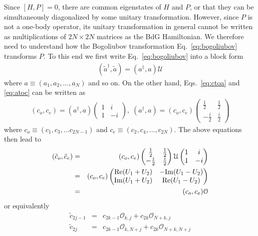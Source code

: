 Since $[H,P] = 0$, there are common eigenstates of $H$ and $P$, or that they can be simultaneously diagonalized by some unitary transformation. However, since $P$ is not a one-body operator, its unitary transformation in general cannot be written as multiplications of $2N\times 2N$ matrices as the BdG Hamiltonian. We therefore need to understand how the Bogoliubov transformation Eq.~\ref{eq:bogoliubov} transforms $P$. To this end we first write Eq.~\ref{eq:bogoliubov} into a block form
\begin{eqnarray}
	(\tilde{a}^\dag, \tilde{a}) = (a^\dag, a)\mathcal{U}
\end{eqnarray}
where $a \equiv (a_1, a_2,\dots, a_N)$ and so on. On the other hand, Eqs.~\ref{eq:ctoa} and \ref{eq:atoc} can be written as
\begin{eqnarray}
	(c_o, c_e) = (a^\dag, a) \begin{pmatrix}
		1 & i\\
		1 & -i
	\end{pmatrix},\; (a^\dag, a) = (c_o, c_e) \begin{pmatrix}
	\frac{1}{2} & \frac{1}{2}\\
	-\frac{i}{2} & \frac{i}{2}
\end{pmatrix}
\end{eqnarray}
where $c_o \equiv (c_1, c_3, \dots c_{2N-1})$ and $c_e\equiv(c_2, c_4, \dots, c_{2N})$. The above equations then lead to
\begin{eqnarray}
	(\tilde{c}_o, \tilde{c}_e) &=& (c_o, c_e) \begin{pmatrix}
		\frac{1}{2} & \frac{1}{2}\\
		-\frac{i}{2} & \frac{i}{2}
	\end{pmatrix} \mathcal{U} \begin{pmatrix}
		1 & i\\
		1 & -i
	\end{pmatrix} \\\nonumber
&=& (c_o, c_e) \begin{pmatrix}
	{\rm Re}(U_1 + U_2) & -{\rm Im}(U_1 - U_2) \\
	{\rm Im}(U_1 + U_2) &  {\rm Re}(U_1 - U_2)
\end{pmatrix}\\\nonumber
&=& (c_o, c_e) \mathcal{O}
\end{eqnarray}
or equivalently
\begin{eqnarray}
	\tilde{c}_{2j-1} &=& c_{2k-1} \mathcal{O}_{k,j} + c_{2k}\mathcal{O}_{N+k, j}\\\nonumber
	\tilde{c}_{2j} &=& c_{2k-1} \mathcal{O}_{k,N+j} + c_{2k}\mathcal{O}_{N+k, N+j}
\end{eqnarray}

